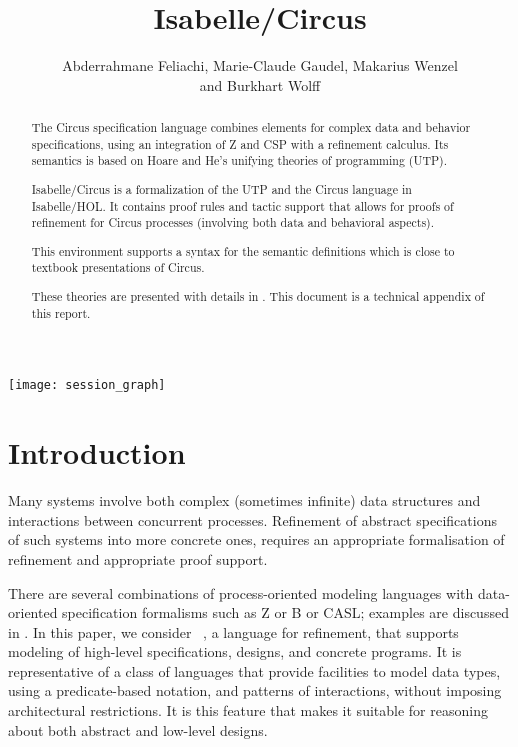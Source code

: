 \documentclass[11pt,a4paper]{article}
\begin{document}
\title{Isabelle/Circus}
\author{Abderrahmane Feliachi, Marie-Claude Gaudel, Makarius Wenzel \\
        and Burkhart Wolff}
\maketitle

\begin{abstract}
The Circus specification language combines elements for complex data and behavior specifications, 
using an integration of Z and CSP with a refinement calculus. Its semantics is based on Hoare and He's
unifying theories of programming (UTP).

Isabelle/Circus is a formalization of the UTP and the Circus language in Isabelle/HOL.
It contains proof rules and tactic support that allows for proofs
of refinement for Circus processes (involving both data and behavioral aspects).

This environment supports a syntax for the semantic definitions which is close to textbook presentations of Circus.

These theories are presented with details in \cite{fgw11rapport-lri}. This document is a technical appendix of this report.
\end{abstract}

\tableofcontents

\begin{center}
  \texttt{[image: session\_graph]}
\end{center}

\newpage

\section{Introduction} 
Many systems involve both complex (sometimes infinite) data structures and interactions between concurrent processes. Refinement of abstract specifications of such systems into more concrete ones, requires an appropriate formalisation of 
refinement and appropriate proof support.


There are several combinations of process-oriented modeling languages
with data-oriented specification formalisms such as Z or B or CASL; examples
are discussed in \cite{Butler99csp2b:a,Fischer:1998:CZP:647283.722938,Taguchi:1997:SCS:523981.852142,Roggenbach:2006}.
In this paper, we consider \Circus\ \cite{WC02}, a
language for refinement, that supports modeling of high-level
specifications, designs, and concrete programs. It is representative
of a class of languages that provide facilities to model data types,
using a predicate-based notation, and patterns of interactions, without imposing 
architectural restrictions. It is this feature that makes
it suitable for reasoning about both abstract and low-level
designs. 
\end{document}
